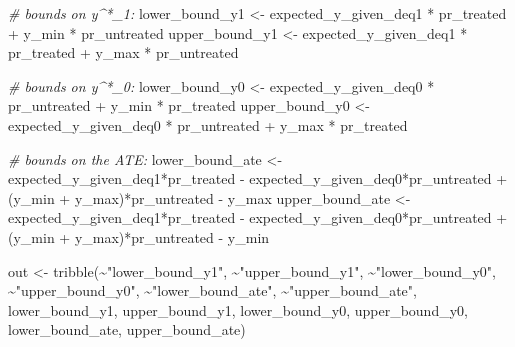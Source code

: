 \documentclass[
]{article}
\newenvironment{Shaded}{\begin{snugshade}}{\end{snugshade}}
\newcommand{\CommentTok}[1]{\textcolor[rgb]{0.56,0.35,0.01}{\textit{#1}}}
\newcommand{\FunctionTok}[1]{\textcolor[rgb]{0.00,0.00,0.00}{#1}}
\newcommand{\NormalTok}[1]{#1}
\newcommand{\OtherTok}[1]{\textcolor[rgb]{0.56,0.35,0.01}{#1}}
\newcommand{\SpecialCharTok}[1]{\textcolor[rgb]{0.00,0.00,0.00}{#1}}
\newcommand{\StringTok}[1]{\textcolor[rgb]{0.31,0.60,0.02}{#1}}
\let\oldShaded\Shaded
\let\endoldShaded\endShaded
\renewenvironment{Shaded}{\footnotesize\oldShaded}{\endoldShaded}
\begin{document}
\begin{Shaded}
\begin{Highlighting}[]
  \CommentTok{\# bounds on y\^{}*\_1: }
\NormalTok{  lower\_bound\_y1 }\OtherTok{\textless{}{-}}\NormalTok{ expected\_y\_given\_deq1 }\SpecialCharTok{*}\NormalTok{ pr\_treated }\SpecialCharTok{+}\NormalTok{ y\_min }\SpecialCharTok{*}\NormalTok{ pr\_untreated }
\NormalTok{  upper\_bound\_y1 }\OtherTok{\textless{}{-}}\NormalTok{ expected\_y\_given\_deq1 }\SpecialCharTok{*}\NormalTok{ pr\_treated }\SpecialCharTok{+}\NormalTok{ y\_max }\SpecialCharTok{*}\NormalTok{ pr\_untreated}
  
  \CommentTok{\# bounds on y\^{}*\_0:}
\NormalTok{  lower\_bound\_y0 }\OtherTok{\textless{}{-}}\NormalTok{ expected\_y\_given\_deq0 }\SpecialCharTok{*}\NormalTok{ pr\_untreated }\SpecialCharTok{+}\NormalTok{ y\_min }\SpecialCharTok{*}\NormalTok{ pr\_treated }
\NormalTok{  upper\_bound\_y0 }\OtherTok{\textless{}{-}}\NormalTok{ expected\_y\_given\_deq0 }\SpecialCharTok{*}\NormalTok{ pr\_untreated }\SpecialCharTok{+}\NormalTok{ y\_max }\SpecialCharTok{*}\NormalTok{ pr\_treated}
  
  \CommentTok{\# bounds on the ATE:}
\NormalTok{  lower\_bound\_ate }\OtherTok{\textless{}{-}}\NormalTok{ expected\_y\_given\_deq1}\SpecialCharTok{*}\NormalTok{pr\_treated }\SpecialCharTok{{-}}\NormalTok{ expected\_y\_given\_deq0}\SpecialCharTok{*}\NormalTok{pr\_untreated }\SpecialCharTok{+} 
\NormalTok{    (y\_min }\SpecialCharTok{+}\NormalTok{ y\_max)}\SpecialCharTok{*}\NormalTok{pr\_untreated }\SpecialCharTok{{-}}\NormalTok{ y\_max }
\NormalTok{  upper\_bound\_ate }\OtherTok{\textless{}{-}}\NormalTok{ expected\_y\_given\_deq1}\SpecialCharTok{*}\NormalTok{pr\_treated }\SpecialCharTok{{-}}\NormalTok{ expected\_y\_given\_deq0}\SpecialCharTok{*}\NormalTok{pr\_untreated }\SpecialCharTok{+} 
\NormalTok{    (y\_min }\SpecialCharTok{+}\NormalTok{ y\_max)}\SpecialCharTok{*}\NormalTok{pr\_untreated }\SpecialCharTok{{-}}\NormalTok{ y\_min}
  
\NormalTok{  out }\OtherTok{\textless{}{-}} \FunctionTok{tribble}\NormalTok{(}\SpecialCharTok{\textasciitilde{}}\StringTok{"lower\_bound\_y1"}\NormalTok{, }\SpecialCharTok{\textasciitilde{}}\StringTok{"upper\_bound\_y1"}\NormalTok{, }\SpecialCharTok{\textasciitilde{}}\StringTok{"lower\_bound\_y0"}\NormalTok{,}
                 \SpecialCharTok{\textasciitilde{}}\StringTok{"upper\_bound\_y0"}\NormalTok{, }\SpecialCharTok{\textasciitilde{}}\StringTok{"lower\_bound\_ate"}\NormalTok{, }\SpecialCharTok{\textasciitilde{}}\StringTok{"upper\_bound\_ate"}\NormalTok{,}
\NormalTok{          lower\_bound\_y1, upper\_bound\_y1, lower\_bound\_y0, upper\_bound\_y0, lower\_bound\_ate, upper\_bound\_ate)}
  

\end{Highlighting}
\end{Shaded}
\end{document}
